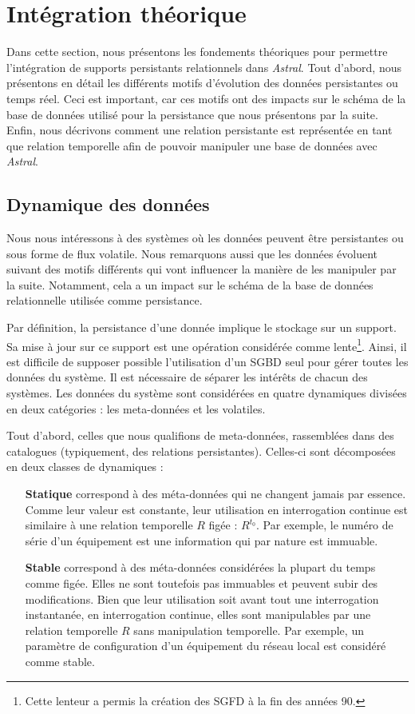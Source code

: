 \section{Intégration théorique}\label{sec:contrib:asteroid:theorie}
Dans cette section, nous présentons les fondements théoriques pour permettre l'intégration de supports persistants relationnels dans \textit{Astral}. Tout d'abord, nous présentons en détail les différents motifs d'évolution des données persistantes ou temps réel. Ceci est important, car ces motifs ont des impacts sur le schéma de la base de données utilisé pour la persistance que nous présentons par la suite. Enfin, nous décrivons comment une relation persistante est représentée en tant que relation temporelle afin de pouvoir manipuler une base de données avec \textit{Astral}.

\subsection{Dynamique des données}
Nous nous intéressons à des systèmes où les données peuvent être persistantes ou sous forme de flux volatile. Nous remarquons aussi que les données évoluent suivant des motifs différents qui vont influencer la manière de les manipuler par la suite. Notamment, cela a un impact sur le schéma de la base de données relationnelle utilisée comme persistance.

Par définition, la persistance d'une donnée implique le stockage sur un support. Sa mise à jour sur ce support est une opération considérée comme lente\footnote{Cette lenteur a permis la création des SGFD à la fin des années 90.}. Ainsi, il est difficile de supposer possible l'utilisation d'un SGBD seul pour gérer toutes les données du système. Il est nécessaire de séparer les intérêts de chacun des systèmes. Les données du système sont considérées en quatre dynamiques divisées en deux catégories : les meta-données et les volatiles. 

Tout d'abord, celles que nous qualifions de meta-données, rassemblées dans des catalogues (typiquement, des relations persistantes). Celles-ci sont décomposées en deux classes de dynamiques :
\begin{itemize}
	\item[\textbf{Statique}] correspond à des méta-données qui ne changent jamais par essence. Comme leur valeur est constante, leur utilisation en interrogation continue est similaire à une relation temporelle $R$ figée : $R^{t_0}$. Par exemple, le numéro de série d'un équipement est une information qui par nature est immuable.
	\item[\textbf{Stable}] correspond à des méta-données considérées la plupart du temps comme figée. Elles ne sont toutefois pas immuables et peuvent subir des modifications. Bien que leur utilisation soit avant tout une interrogation instantanée, en interrogation continue, elles sont manipulables par une relation temporelle $R$ sans manipulation temporelle. Par exemple, un paramètre de configuration d'un équipement du réseau local est considéré comme stable.
\end{itemize}

